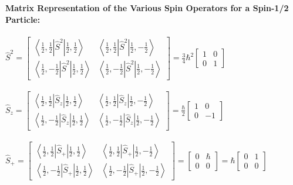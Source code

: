 \textbf{ Matrix Representation of the Various Spin Operators for a Spin-1/2 Particle:}\\\\
$\hat{S}^{2}=\left[\begin{array}{ll}
	\left\langle\frac{1}{2}, \frac{1}{2}\left|\hat{S}^{2}\right| \frac{1}{2}, \frac{1}{2}\right\rangle & \left\langle\frac{1}{2}, \frac{1}{2}\left|\hat{S}^{2}\right| \frac{1}{2},-\frac{1}{2}\right\rangle \\
	\left\langle\frac{1}{2},-\frac{1}{2}\left|\hat{S}^{2}\right| \frac{1}{2}, \frac{1}{2}\right\rangle & \left\langle\frac{1}{2},-\frac{1}{2}\left|\hat{S}^{2}\right| \frac{1}{2},-\frac{1}{2}\right\rangle
\end{array}\right]=\frac{3}{4} \hbar^{2}\left[\begin{array}{ll}
	1 & 0 \\
	0 & 1
\end{array}\right]$\\\\

$\hat{S}_{z}=\left[\begin{array}{ll}
	\left\langle\frac{1}{2}, \frac{1}{2}\left|\hat{S}_{z}\right| \frac{1}{2}, \frac{1}{2}\right\rangle & \left\langle\frac{1}{2}, \frac{1}{2}\left|\hat{S}_{z}\right| \frac{1}{2},-\frac{1}{2}\right\rangle \\
	\left\langle\frac{1}{2},-\frac{1}{2}\left|\hat{S}_{z}\right| \frac{1}{2}, \frac{1}{2}\right\rangle & \left\langle\frac{1}{2},-\frac{1}{2}\left|\hat{S}_{z}\right| \frac{1}{2},-\frac{1}{2}\right\rangle
\end{array}\right]=\frac{\hbar}{2}\left[\begin{array}{cc}
	1 & 0 \\
	0 & -1
\end{array}\right]$\\\\

$\hat{S}_{+}=\left[\begin{array}{cc}
	\left\langle\frac{1}{2}, \frac{1}{2}\left|\hat{S}_{+}\right| \frac{1}{2}, \frac{1}{2}\right\rangle & \left\langle\frac{1}{2}, \frac{1}{2}\left|\hat{S}_{+}\right| \frac{1}{2},-\frac{1}{2}\right\rangle \\
	\left\langle\frac{1}{2},-\frac{1}{2}\left|\hat{S}_{+}\right| \frac{1}{2}, \frac{1}{2}\right\rangle & \left\langle\frac{1}{2},-\frac{1}{2}\left|\hat{S}_{+}\right| \frac{1}{2},-\frac{1}{2}\right\rangle
\end{array}\right]=\left[\begin{array}{ll}
	0 & \hbar \\
	0 & 0
\end{array}\right]=\hbar\left[\begin{array}{ll}
	0 & 1 \\
	0 & 0
\end{array}\right]$\\\\

